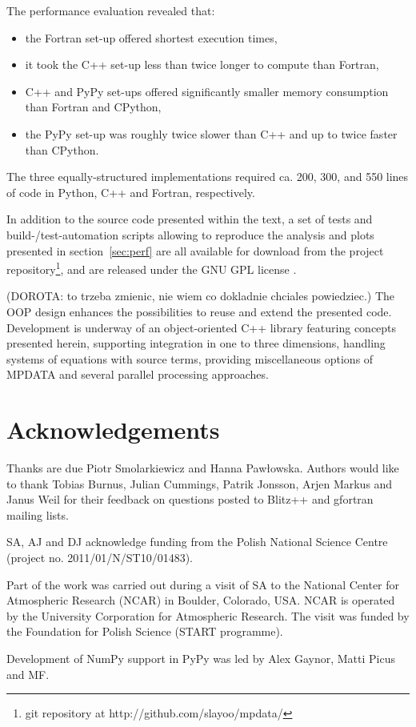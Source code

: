 \documentclass[final,5p,times,twocolumn]{elsarticle}
\newcommand{\url}[1]{{#1}}
\begin{document}
    
  The performance evaluation revealed that:
    \begin{itemize}
      \item{the Fortran set-up offered shortest execution times,}
      \item{it took the C++ set-up less than twice longer to compute than Fortran,}
      \item{C++ and PyPy set-ups offered significantly smaller memory consumption 
        than Fortran and CPython,}
      \item{the PyPy set-up was roughly twice slower than C++ and up to twice faster than CPython.}
    \end{itemize}
  The three equally-structured implementations required ca. 200, 300, and 550 lines of code %
    in Python, C++ and Fortran, respectively.  

  In addition to the source code presented within the text,
    a set of tests and build-/test-automation scripts
    allowing to reproduce the analysis and plots presented in section~\ref{sec:perf} are all 
    available for download from the project repository\footnote{git repository at \url{http://github.com/slayoo/mpdata/}},
    and are released under the GNU GPL license \citep{GPLv3}.

(DOROTA: to trzeba zmienic, nie wiem co dokladnie chciales powiedziec.)
  The OOP design enhances the possibilities to reuse and extend the presented code.
  Development is underway of an object-oriented C++ library featuring concepts presented herein,
    supporting integration in one to three dimensions, handling systems of equations with source terms, 
    providing miscellaneous options of MPDATA and several parallel processing approaches.

  \section*{Acknowledgements}
  {\small
    \noindent 
    Thanks are due Piotr Smolarkiewicz and Hanna Pawłowska.
    \noindent
    Authors would like to thank Tobias Burnus, Julian Cummings, Patrik Jonsson,
      Arjen Markus and Janus Weil for their feedback on questions posted to Blitz++ and gfortran
      mailing lists.
    
    \noindent
    SA, AJ and DJ acknowledge funding from the Polish National Science Centre
      (project no. 2011/01/N/ST10/01483).

    \noindent
    Part of the work was carried out during a visit of SA to the National
      Center for Atmospheric Research (NCAR) in Boulder, Colorado, USA.
    NCAR is operated by the University Corporation for Atmospheric Research.
    The visit was funded by the Foundation for Polish Science (START programme).
 
    \noindent
    Development of NumPy support in PyPy was led by Alex Gaynor, Matti Picus and MF.
  }
\end{document}
